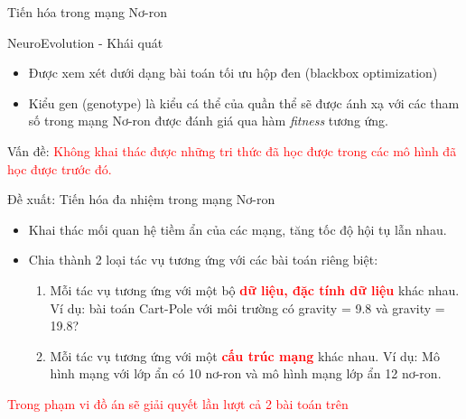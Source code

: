 	\begin{frame}{Tiến hóa trong mạng Nơ-ron}
		\begin{itemize}
    		\begin{block}{NeuroEvolution - Khái quát}
    		\begin{itemize}
    		    \setlength\itemsep{0.01em}
    		    \item Được xem xét dưới dạng bài toán tối ưu hộp đen (blackbox optimization)
    		    \item Kiểu gen (genotype) là kiểu cá thể của quần thể sẽ được ánh xạ với các tham số trong mạng Nơ-ron được đánh giá qua hàm \emph{fitness} tương ứng.
    		    \end{itemize}
    		    Vấn đề: \textcolor{red}{Không khai thác được những tri thức đã học được trong các mô hình đã học được trước đó.}
    		\end{block}\pause
    		\begin{block}{Đề xuất: Tiến hóa đa nhiệm trong mạng Nơ-ron}
    		\begin{itemize}
    		    \setlength\itemsep{0.01em}
    		    \item Khai thác mối quan hệ tiềm ẩn của các mạng, tăng tốc độ hội tụ lẫn nhau.
    		    \item Chia thành 2 loại tác vụ tương ứng với các bài toán riêng biệt:
    		    \begin{enumerate}
    		        \setlength\itemsep{0.01em}
    		        \item Mỗi tác vụ tương ứng với một bộ \textbf{\textcolor{red}{dữ liệu, đặc tính dữ liệu}} khác nhau. Ví dụ: bài toán Cart-Pole với môi trường có gravity = 9.8 và gravity = 19.8?
    		        \item Mỗi tác vụ tương ứng với một \textbf{\textcolor{red}{cấu trúc mạng}} khác nhau. Ví dụ: Mô hình mạng với lớp ẩn có 10 nơ-ron và mô hình mạng lớp ẩn 12 nơ-ron.
    		    \end{enumerate}
    		\end{itemize}
    		\textcolor{red}{Trong phạm vi đồ án sẽ giải quyết lần lượt cả 2 bài toán trên}
    		\end{block}
        \end{itemize}
	\end{frame}
